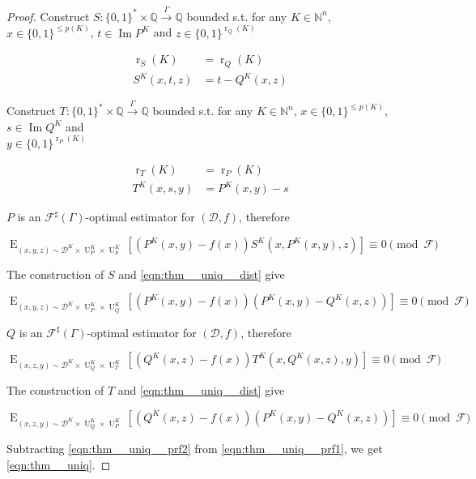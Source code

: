\documentclass[11pt]{article}
\numberwithin{equation}{section}
\theoremstyle{definition}
\theoremstyle{plain}
\newcommand{\Bool}{\{0,1\}}
\newcommand{\Words}{{\Bool^*}}
\DeclareMathOperator{\Img}{Im}
\DeclareMathOperator{\E}{E}
\DeclareMathOperator{\R}{r}
\DeclareMathOperator{\Un}{U}
\newcommand{\Nats}{\mathbb{N}}
\newcommand{\Rats}{\mathbb{Q}}
\newcommand{\Dist}{\mathcal{D}}
\newcommand{\Fall}{\mathcal{F}}
\newcommand{\ESG}{\Fall^\sharp(\Gamma)}
\newcommand{\BoolR}[1]{\Bool^{\R_{#1}(K)}}
\newcommand{\Scheme}{\xrightarrow{\Gamma}}
\begin{document}
\begin{proof}

Construct ${S: \Words \times \Rats \Scheme \Rats}$ bounded s.t. for any ${K \in \Nats^n}$, ${x \in \Bool^{\leq p(K)}}$, ${t \in \Img P^K}$ and ${z \in \BoolR{Q}}$

\begin{align*}
\R_{S}(K) &= \R_Q(K) \\
S^K(x,t,z) &= t-Q^K(x,z) 
\end{align*}

Construct ${T: \Words \times \Rats \Scheme \Rats}$ bounded s.t. for any ${K \in \Nats^n}$, ${x \in \Bool^{\leq p(K)}}$, ${s \in \Img Q^K}$ and\\ $y \in \BoolR{P}$

\begin{align*}
\R_{T}(K) &= \R_P(K) \\
T^K(x,s,y) &= P^K(x,y)-s 
\end{align*}

${P}$ is an ${\ESG}$-optimal estimator for ${(\Dist,f)}$, therefore

\[\E_{(x,y,z) \sim \Dist^K \times \Un_P^K \times \Un_S^K}[(P^K(x,y)-f(x))S^K(x,P^K(x,y),z)] \equiv 0 \pmod \Fall\]

The construction of ${S}$ and \ref{eqn:thm__uniq__dist} give

\begin{equation}
\label{eqn:thm__uniq__prf1}
\E_{(x,y,z) \sim \Dist^K \times \Un_P^K \times \Un_Q^K}[(P^K(x,y)-f(x))(P^K(x,y)-Q^K(x,z))] \equiv 0 \pmod \Fall
\end{equation}

${Q}$ is an ${\ESG}$-optimal estimator for ${(\Dist,f)}$, therefore

\[\E_{(x,z,y) \sim \Dist^K \times \Un_Q^K \times \Un_T^K}[(Q^K(x,z)-f(x))T^K(x,Q^K(x,z),y)] \equiv 0 \pmod \Fall\]

The construction of ${T}$ and \ref{eqn:thm__uniq__dist} give

\begin{equation}
\label{eqn:thm__uniq__prf2}
\E_{(x,z,y) \sim \Dist^K \times \Un_Q^K \times \Un_P^K}[(Q^K(x,z)-f(x))(P^K(x,y)-Q^K(x,z))] \equiv 0 \pmod \Fall
\end{equation}

Subtracting \ref{eqn:thm__uniq__prf2} from \ref{eqn:thm__uniq__prf1}, we get \ref{eqn:thm__uniq}.
%
\end{proof}
\end{document}
